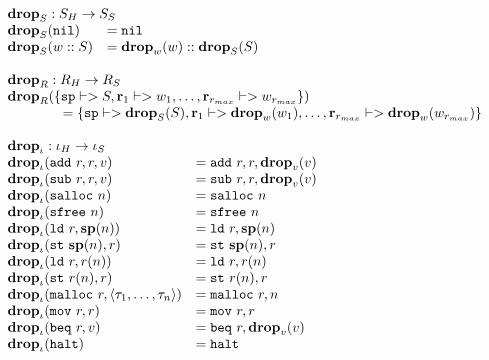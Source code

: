 {\[\begin{array}{l}
\begin{array}{ll}
\rlap{$\drop{S} : \high S -> \simple{S}$} \\
\drop{S}(\mathtt{nil}) &= \mathtt{nil} \\
\drop{S}(w :: S) &= \drop{w}(w) :: \drop{S}(S) \\
\end{array} \\\\

\begin{array}{l}
\drop{R} : \high R -> \simple{R} \\
\drop{R}(\{\mathtt{sp} |-> S, \mathbf{r}_1 |-> w_1, \dots, \mathbf{r}_{r_{max}} |-> w_{r_{max}}\})\\
\quad\quad\quad\quad = \{\mathtt{sp} |-> \drop{S}(S), \mathbf{r}_1 |-> \drop{w}(w_1), \dots, \mathbf{r}_{r_{max}} |-> \drop{w}(w_{r_{max}})\}
\end{array} \\\\

\begin{array}{ll}
\rlap{$\drop{\iota} : \high\iota -> \simple\iota$} \\
\drop{\iota}(\mathtt{add}\ r, r, v) &= \mathtt{add}\ r, r, \drop{v}(v) \\
\drop{\iota}(\mathtt{sub}\ r, r, v) &= \mathtt{sub}\ r, r, \drop{v}(v) \\
\drop{\iota}(\mathtt{salloc}\ n) &= \mathtt{salloc}\ n \\
\drop{\iota}(\mathtt{sfree}\ n) &= \mathtt{sfree}\ n \\
\drop{\iota}(\mathtt{ld}\ r, \mathbf{sp}(n)) &= \mathtt{ld}\ r, \mathbf{sp}(n) \\
\drop{\iota}(\mathtt{st}\ \mathbf{sp}(n), r) &= \mathtt{st}\ \mathbf{sp}(n), r \\
\drop{\iota}(\mathtt{ld}\ r, r(n)) &= \mathtt{ld}\ r, r(n) \\
\drop{\iota}(\mathtt{st}\ r(n), r) &= \mathtt{st}\ r(n), r \\
\drop{\iota}(\mathtt{malloc}\ r, \langle \tau_1, \dots, \tau_n \rangle) &= \mathtt{malloc}\ r, n \\
\drop{\iota}(\mathtt{mov}\ r, r) &= \mathtt{mov}\ r, r \\
\drop{\iota}(\mathtt{beq}\ r, v) &= \mathtt{beq}\ r, \drop{v}(v) \\
\drop{\iota}(\mathtt{halt}) &= \mathtt{halt} \\
\end{array} \\\\


\end{array}\]}
